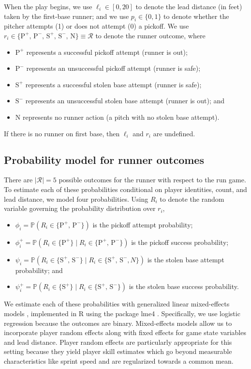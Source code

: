 \documentclass[opre,dblanonrev]{informs4}
\begin{document}
    When the play begins, we use $\ell_i \in [0, 20]$ to denote the lead distance (in feet) taken by the first-base runner; and we use $p_i \in \{0, 1\}$ to denote whether the pitcher attempts (1) or does not attempt (0) a pickoff. We use $r_i \in \{\mbox{P}^+,\, \mbox{P}^-,\, \mbox{S}^+,\, \mbox{S}^-,\, \mbox{N}\} \equiv \mathcal{R}$ to denote the runner outcome, where
    \begin{itemize}
      \item $\mbox{P}^+$ represents a successful pickoff attempt (runner is out);
      \item $\mbox{P}^-$ represents an unsuccessful pickoff attempt (runner is safe);
      \item $\mbox{S}^+$ represents a successful stolen base attempt (runner is safe);
      \item $\mbox{S}^-$ represents an unsuccessful stolen base attempt (runner is out); and
      \item $\mbox{N}$ represents no runner action (a pitch with no stolen base attempt).
    \end{itemize}
    If there is no runner on first base, then $\ell_i$ and $r_i$ are undefined.

    \subsection{Probability model for runner outcomes}
    \label{sec:prob-runner-outcome}

      There are $|\mathcal{R}| = 5$ possible outcomes for the runner with respect to the run game. To estimate each of these probabilities conditional on player identities, count, and lead distance, we model four probabilities. Using $R_i$ to denote the random variable governing the probability distribution over $r_i$,
      \begin{itemize}
        \item $\phi_i = \mathbb{P}(R_i \in \{\mbox{P}^+,\, \mbox{P}^-\})$ is the pickoff attempt probability;
        \item $\phi_i^+ = \mathbb{P}(R_i \in \{\mbox{P}^+\} \mid R_i \in \{\mbox{P}^+,\, \mbox{P}^-\})$ is the pickoff success probability;
        \item $\psi_i = \mathbb{P}(R_i \in \{\mbox{S}^+,\, \mbox{S}^-\} \mid R_i \in \{\mbox{S}^+,\, \mbox{S}^-, N\})$ is the stolen base attempt probability; and
        \item $\psi_i^+ = \mathbb{P}(R_i \in \{\mbox{S}^+\} \mid R_i \in \{\mbox{S}^+,\, \mbox{S}^-\})$ is the stolen base success probability.
      \end{itemize}
      We estimate each of these probabilities with generalized linear mixed-effects models \citep{stroup_generalized_2012}, implemented in R using the package lme4 \citep{bates_fitting_2015}. Specifically, we use logistic regression because the outcomes are binary. Mixed-effects models allow us to incorporate player random effects along with fixed effects for game state variables and lead distance. Player random effects are particularly appropriate for this setting because they yield player skill estimates which go beyond measurable characteristics like sprint speed and are regularized towards a common mean.
\end{document}
